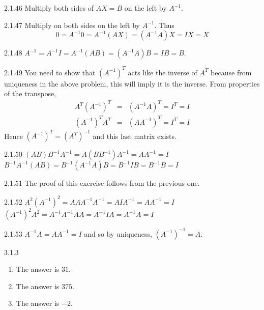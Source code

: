 \begin{Answer}{2.1.46}
Multiply both sides of $AX=B$ on the left by $A^{-1}$.
\end{Answer}
\begin{Answer}{2.1.47}
Multiply on both sides on the left by $A^{-1}.$ Thus
\[
0=A^{-1}0=A^{-1}\left( AX\right) =\left(
A^{-1}A\right) X=IX = X
\]
\end{Answer}
\begin{Answer}{2.1.48}
 $A^{-1}=A^{-1}I=A^{-1}\left( AB\right) =\left( A^{-1}A\right) B=IB=B.$
\end{Answer}
\begin{Answer}{2.1.49}
 You need to show that $\left( A^{-1}\right) ^{T}$ acts like the inverse of $A^{T}
$ because from uniqueness in the above problem, this will imply it is the
inverse. From properties of the transpose,
\begin{eqnarray*}
A^{T}\left( A^{-1}\right) ^{T} &=&\left( A^{-1}A\right) ^{T}=I^{T}=I \\
\left( A^{-1}\right) ^{T}A^{T} &=&\left( AA^{-1}\right) ^{T}=I^{T}=I
\end{eqnarray*}
Hence $\left( A^{-1}\right) ^{T}=\left( A^{T}\right) ^{-1}$ and this last
matrix exists.
\end{Answer}
\begin{Answer}{2.1.50}
$\left( AB\right)
B^{-1}A^{-1}=A\left( BB^{-1}\right) A^{-1}=AA^{-1}=I$ $B^{-1}A^{-1}\left(
AB\right) =B^{-1}\left( A^{-1}A\right) B=B^{-1}IB=B^{-1}B=I$
\end{Answer}
\begin{Answer}{2.1.51}
The proof of this exercise follows from the previous one.
\end{Answer}
\begin{Answer}{2.1.52}
$A^{2}\left( A^{-1}\right) ^{2}=AAA^{-1}A^{-1}=AIA^{-1}=AA^{-1}=I$ $\left(
A^{-1}\right) ^{2}A^{2}=A^{-1}A^{-1}AA=A^{-1}IA=A^{-1}A=I$
\end{Answer}
\begin{Answer}{2.1.53}
 $A^{-1}A=AA^{-1}=I$ and so by
uniqueness, $\left( A^{-1}\right) ^{-1}=A$.
\end{Answer}
\begin{Answer}{3.1.3}
\begin{enumerate}
\item The answer is $31$.
\item The answer is $375$.
\item The answer is $-2$.
\end{enumerate}
\end{Answer}
